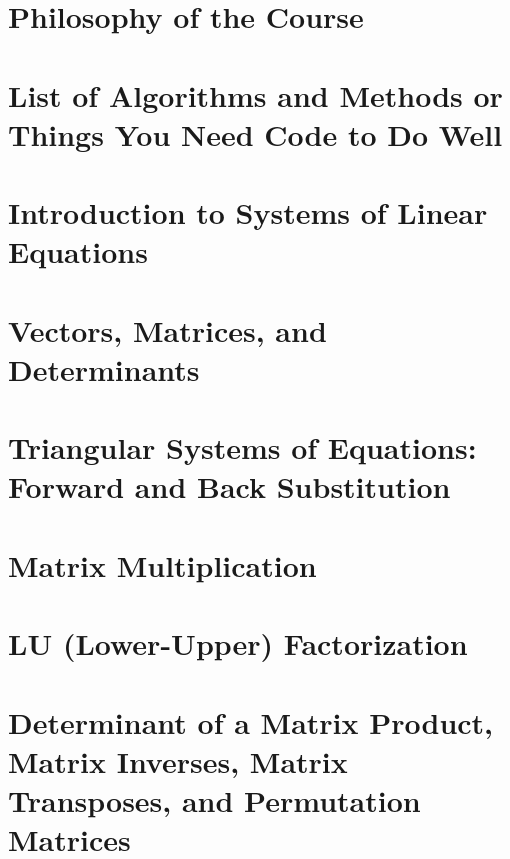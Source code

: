 \documentclass[letterpaper]{book}
\makeatletter
\renewcommand{\mainmatter}{\cleardoublepage\@mainmattertrue}
\makeatother
\begin{document}
\chapter{Philosophy of the Course}

\chapter{List of Algorithms and Methods or Things You Need Code to Do Well}

\mainmatter

\chapter{Introduction to  Systems of Linear Equations}
\label{chap:Intro}


\chapter{Vectors, Matrices, and Determinants}
\label{chap:Chap02VectorsMatricesDeterminants}


\chapter{Triangular Systems of Equations: Forward and Back Substitution}
\label{chap:Chap03TriangularForwardBAckSubstitution}


\chapter{Matrix Multiplication}
\label{chap:MatrixMultiplication}


\chapter{LU (Lower-Upper) Factorization}
\label{chap:LUfactorization}


\chapter{Determinant of a Matrix Product, Matrix Inverses, Matrix Transposes, and Permutation Matrices}
\label{chap:MatrixProductInversesDeterminants}

\end{document}
